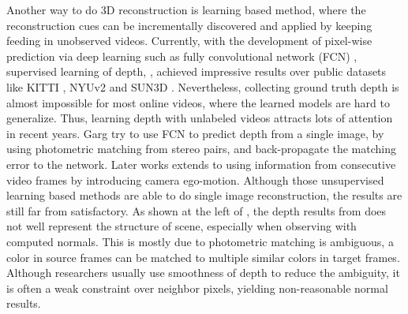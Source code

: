 Another way to do 3D reconstruction is learning based method, where the reconstruction cues can be incrementally discovered and applied by keeping feeding in unobserved videos. Currently, with the development of pixel-wise prediction via deep learning such as fully convolutional network (FCN) \cite{}, supervised learning of depth, \eg \cite{}, achieved impressive results over public datasets like KITTI \cite{}, NYUv2 \cite{} and SUN3D \cite{}. 
Nevertheless, collecting ground truth depth is almost impossible for most online videos, where the learned models are hard to generalize. 
Thus, learning depth with unlabeled videos attracts lots of attention in recent years.
Garg \etal \cite{godard2016unsupervised} try to use FCN to predict depth from a single image, by using photometric matching from stereo pairs, and back-propagate the matching error to the network. Later works \cite{zhou2017unsupervised,Vijayanarasimhan17} extends to using information from consecutive video frames by introducing camera ego-motion. 
Although those unsupervised learning based methods are able to do single image reconstruction, the results are still far from satisfactory. As shown at the left of , the depth results from \cite{zhou2017unsupervised} does not well represent the structure of scene, especially when observing with computed normals. 
This is mostly due to photometric matching is ambiguous, \ie a color in source frames can be matched to multiple similar colors in target frames. Although researchers usually use smoothness of depth \cite{zhou2017unsupervised} to reduce the ambiguity, it is often a weak constraint over neighbor pixels, yielding non-reasonable normal results.

